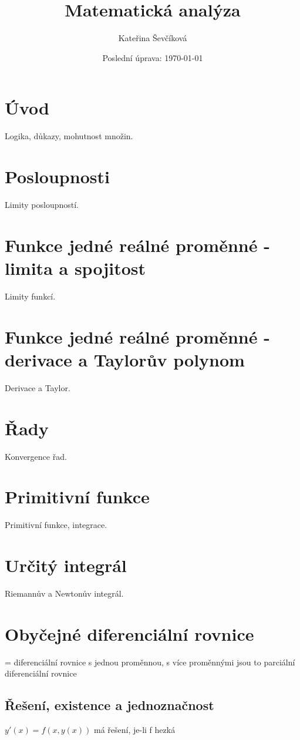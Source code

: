 \documentclass{article}
\title{Matematická analýza}
\author{Kateřina Ševčíková}
\date{Poslední úprava: \today}
\theoremstyle{definition}
\begin{document}
\maketitle

\tableofcontents
\newpage

\section{Úvod}
Logika, důkazy, mohutnost množin.

\section{Posloupnosti}
Limity posloupností.

\section{Funkce jedné reálné proměnné - limita a spojitost}
Limity funkcí.

\section{Funkce jedné reálné proměnné - derivace a Taylorův polynom}
Derivace a Taylor.

\section{Řady}
Konvergence řad.

\section{Primitivní funkce}
Primitivní funkce, integrace.

\section{Určitý integrál}
Riemannův a Newtonův integrál.

\section{Obyčejné diferenciální rovnice}
= diferenciální rovnice s jednou proměnnou, s více proměnnými jsou to parciální diferenciální rovnice

\subsection{Řešení, existence a jednoznačnost}
$y'(x) = f(x, y(x))$ má řešení, je-li f hezká
\end{document}
